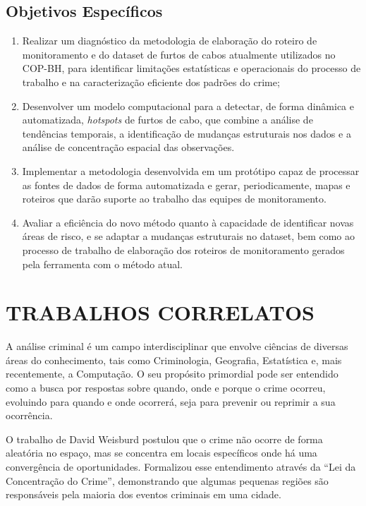 \subsection{Objetivos Específicos}
\label{subsec:objespc}
\begin{enumerate}
  \item{Realizar um diagnóstico da metodologia de elaboração do roteiro de monitoramento e do dataset de furtos de cabos atualmente utilizados no COP-BH, para identificar limitações estatísticas e operacionais do processo de trabalho e na caracterização eficiente dos padrões do crime;}
  \item{Desenvolver um modelo computacional para a detectar, de forma dinâmica e automatizada, \textit{hotspots} de furtos de cabo, que combine a análise de tendências temporais, a identificação de mudanças estruturais nos dados e a análise de concentração espacial das observações.}
  \item{Implementar a metodologia desenvolvida em um protótipo capaz de processar as fontes de dados de forma automatizada e gerar, periodicamente, mapas e roteiros que darão suporte ao trabalho das equipes de monitoramento.}
  \item{Avaliar a eficiência do novo método quanto à capacidade de identificar novas áreas de risco, e se adaptar a mudanças estruturais no dataset, bem como ao processo de trabalho de elaboração dos roteiros de monitoramento gerados pela ferramenta com o método atual.}
\end{enumerate}

\section{TRABALHOS CORRELATOS}
\label{sec:estadoarte}
A análise criminal é um campo interdisciplinar que envolve ciências de diversas áreas do conhecimento, tais como Criminologia, Geografia, Estatística e, mais recentemente, a Computação. O seu propósito primordial pode ser entendido como a busca por respostas sobre quando, onde e porque o crime ocorreu, evoluindo para quando e onde ocorrerá, seja para prevenir ou reprimir a sua ocorrência.

O trabalho de David Weisburd \cite{Weisburd2015} postulou que o crime não ocorre de forma aleatória no espaço, mas se concentra em locais específicos onde há uma convergência de oportunidades. Formalizou esse entendimento através da ``Lei da Concentração do Crime'', demonstrando que algumas pequenas regiões são responsáveis pela maioria dos eventos criminais em uma cidade.

